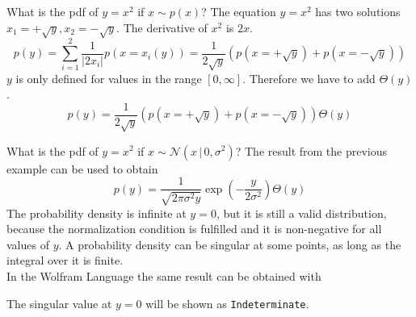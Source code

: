 \documentclass{tstextbook}
\begin{document}
\begin{example}
What is the pdf of $y=x^2$ if $x\sim p(x)$? The equation $y=x^2$ has two solutions $x_1=+\sqrt{y},x_2=-\sqrt{y}$. The derivative of $x^2$ is $2x$.
  \begin{equation}
    p(y)=\sum_{i=1}^{2}\frac{1}{\vert 2x_i\vert}p\left(x=x_i(y)\right)=
    \frac{1}{2\sqrt{y}}\left(p\left(x=+\sqrt{y}\right)+p\left(x=-\sqrt{y}\right)\right)
  \end{equation}
$y$ is only defined for values in the range $[0,\infty]$. Therefore we have to add $\Theta(y)$.
  \begin{equation}
    p(y)=\frac{1}{2\sqrt{y}}\left(p\left(x=+\sqrt{y}\right)+p\left(x=-\sqrt{y}\right)\right)\Theta(y)
  \end{equation} 
\end{example}

\begin{example}
What is the pdf of $y=x^2$ if $x\sim \mathcal{N}(x\,\vert\, 0,\sigma^2)$? The result from the previous example can be used to obtain
  \begin{equation}
    p(y)=\frac{1}{\sqrt{2\pi\sigma^2 y}}\exp\left(-\frac{y}{2\sigma^2}\right)\Theta(y)
  \end{equation}
  The probability density is infinite at $y=0$, but it is still a valid distribution, because the normalization condition is fulfilled and it is non-negative for all values of $y$. A probability density can be singular at some points, as long as the integral over it is finite.\\

In the Wolfram Language the same result can be obtained with
\begin{mathematica}
dist = TransformedDistribution[x^2, x \[Distributed] NormalDistribution[0,\[Sigma]]];
PDF[dist, y]
\end{mathematica}

The singular value at $y=0$ will be shown as \texttt{Indeterminate}.

\end{example}  
\end{document}

